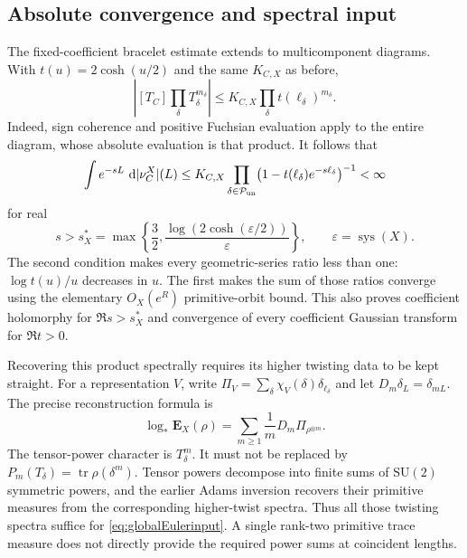 \documentclass[11pt,a4paper]{article}
\numberwithin{equation}{section}
\theoremstyle{definition}
\theoremstyle{remark}
\newcommand{\dd}{\mathop{}\!\mathrm d}
\begin{document}
\subsection{Absolute convergence and spectral input}

The fixed-coefficient bracelet estimate extends to multicomponent
diagrams. With $t(u)=2\cosh(u/2)$ and the same $K_{C,X}$ as before,
\[
 \left|[T_C]\prod_\delta T_\delta^{m_\delta}\right|
 \leq K_{C,X}\prod_\delta t(\ell_\delta)^{m_\delta}.
\]
Indeed, sign coherence and positive Fuchsian evaluation apply to
the entire diagram, whose absolute evaluation is that product.
It follows that
\begin{equation}
 \int e^{-sL}\,\dd|\nu_C^X|(L)
 \leq K_{C,X}
 \prod_{\delta\in\mathcal P_{\rm un}}
 \bigl(1-t(\ell_\delta)e^{-s\ell_\delta}\bigr)^{-1}
 <\infty
 \label{eq:globalEulerbound}
\end{equation}
for real
\begin{equation}
 s>s_X^*=
 \max\left\{\frac32,
       \frac{\log(2\cosh(\varepsilon/2))}{\varepsilon}\right\},
 \qquad \varepsilon=\operatorname{sys}(X).
 \label{eq:globalEulerhalfplane}
\end{equation}
The second condition makes every geometric-series ratio less
than one: $\log t(u)/u$ decreases in $u$. The first makes the
sum of those ratios converge using the elementary $O_X(e^R)$
primitive-orbit bound. This also proves coefficient holomorphy
for $\Re s>s_X^*$ and convergence of every coefficient Gaussian
transform for $\Re t>0$.

Recovering this product spectrally requires its higher twisting
data to be kept straight. For a representation $V$, write
$\Pi_V=\sum_\delta\chi_V(\delta)\delta_{\ell_\delta}$ and let
$D_m\delta_L=\delta_{mL}$. The precise reconstruction formula is
\begin{equation}
 \boxed{
 \log_*\mathbf E_X(\rho)
 =\sum_{m\geq1}\frac1m D_m\Pi_{\rho^{\otimes m}}.
 }
 \label{eq:globalEulerinput}
\end{equation}
The tensor-power character is $T_\delta^m$. It must not be
replaced by $P_m(T_\delta)=\operatorname{tr}\rho(\delta^m)$.
Tensor powers decompose into finite sums of $\mathrm{SU}(2)$
symmetric powers, and the earlier Adams inversion recovers their
primitive measures from the corresponding higher-twist spectra.
Thus all those twisting spectra suffice for
\eqref{eq:globalEulerinput}. A single rank-two primitive trace
measure does not directly provide the required power sums at
coincident lengths.
\end{document}
